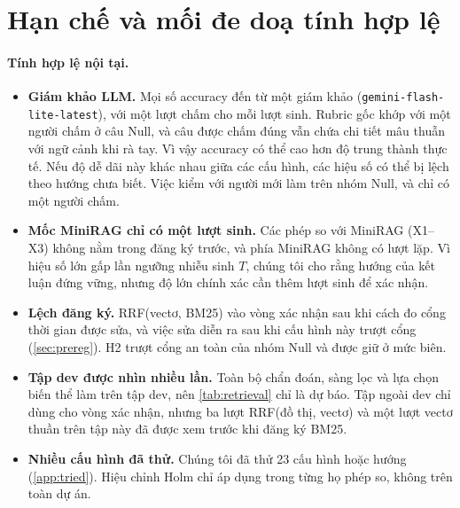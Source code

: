 \section{Hạn chế và mối đe doạ tính hợp lệ}\label{sec:limitations}

\paragraph{Tính hợp lệ nội tại.}
\begin{itemize}
  \item \textbf{Giám khảo LLM.} Mọi số accuracy đến từ một giám khảo (\texttt{gemini-flash-lite-latest}), với một lượt chấm cho mỗi lượt sinh.
  Rubric gốc khớp với một người chấm ở \humanAgreeOrig{} câu Null, và \judgeLenient{} câu được chấm đúng vẫn chứa chi tiết mâu thuẫn với ngữ cảnh khi rà tay.
  Vì vậy accuracy có thể cao hơn độ trung thành thực tế. Nếu độ dễ dãi này khác nhau giữa các cấu hình, các hiệu số có thể bị lệch theo hướng chưa biết.
  Việc kiểm với người mới làm trên nhóm Null, và chỉ có một người chấm.
  \item \textbf{Mốc MiniRAG chỉ có một lượt sinh.} Các phép so với MiniRAG (X1--X3) không nằm trong đăng ký trước, và phía MiniRAG không có lượt lặp.
  Vì hiệu số lớn gấp \ratioXCT{} lần ngưỡng nhiễu sinh $T$, chúng tôi cho rằng hướng của kết luận đứng vững, nhưng độ lớn chính xác cần thêm lượt sinh để xác nhận.
  \item \textbf{Lệch đăng ký.} RRF(vectơ, BM25) vào vòng xác nhận sau khi cách đo cổng thời gian được sửa, và việc sửa diễn ra sau khi cấu hình này trượt cổng (\cref{sec:prereg}).
  H2 trượt cổng an toàn của nhóm Null và được giữ ở mức biên.
  \item \textbf{Tập dev được nhìn nhiều lần.} Toàn bộ chẩn đoán, sàng lọc và lựa chọn biến thể làm trên tập dev, nên \cref{tab:retrieval} chỉ là dự báo.
  Tập ngoài dev chỉ dùng cho vòng xác nhận, nhưng ba lượt RRF(đồ thị, vectơ) và một lượt vectơ thuần trên tập này đã được xem trước khi đăng ký BM25.
  \item \textbf{Nhiều cấu hình đã thử.} Chúng tôi đã thử 23 cấu hình hoặc hướng (\cref{app:tried}). Hiệu chỉnh Holm chỉ áp dụng trong từng họ phép so, không trên toàn dự án.
\end{itemize}

